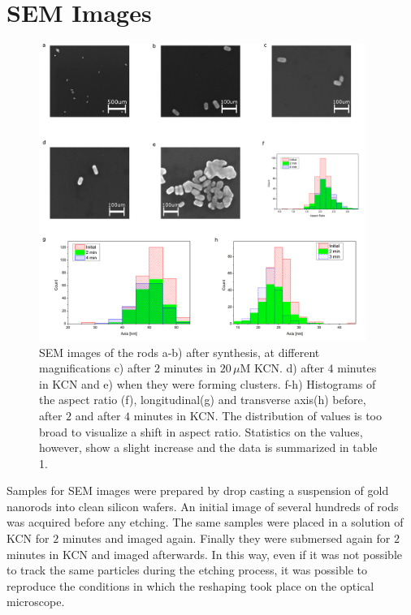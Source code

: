 \documentclass[journal=jpccck]{achemso}
\newcommand{\uM}{\ensuremath{\,\mu\textrm{M}}}
\begin{document}
\section{SEM Images}

\begin{figure}[htp]
 \centering
 \includegraphics[width=0.95\textwidth]{Figures/04_Supporting/02_SEM/sem.png}
 \caption{SEM images of the rods a-b) after synthesis, at different
 magnifications c) after $2$ minutes in $20\uM$ KCN. d) after $4$ minutes in KCN
 and e) when they were forming clusters. f-h) Histograms of the aspect ratio
 (f), longitudinal(g) and transverse axis(h) before, after $2$ and after $4$
 minutes in KCN. The distribution of values is too broad to visualize a shift in
 aspect ratio.
 Statistics on the values, however, show a slight increase and the data is
 summarized in table 1. }
 \label{fig:SEM}
\end{figure}

Samples for SEM images were prepared by drop casting a suspension of gold
nanorods into clean silicon wafers. An initial image of several hundreds of rods
was acquired before any etching. The same samples were placed in a solution of KCN
for $2$ minutes and imaged again. Finally they were submersed again for $2$
minutes in KCN and imaged afterwards. In this way, even if it was not possible
to track the same particles during the etching process, it was possible to
reproduce the conditions in which the reshaping took place on the optical
microscope.
\end{document}
